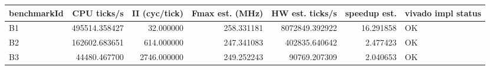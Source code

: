 \begin{tabular}{|l|r|r|r|r|r|l|}
\hline
benchmarkId & CPU ticks/s & II (cyc/tick) & Fmax est. (MHz) & HW est. ticks/s & speedup est. & vivado impl status \\
\hline
B1 & 495514.358427 & 32.000000 & 258.331181 & 8072849.392922 & 16.291858 & OK \\
B2 & 162602.683651 & 614.000000 & 247.341083 & 402835.640642 & 2.477423 & OK \\
B3 & 44480.467700 & 2746.000000 & 249.252243 & 90769.207309 & 2.040653 & OK \\
\hline
\end{tabular}
